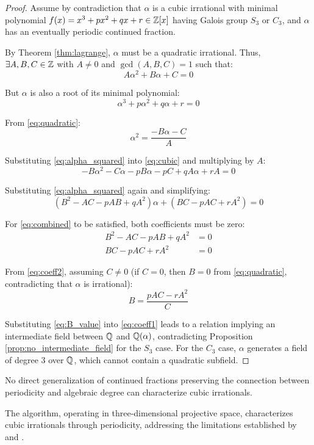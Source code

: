 \begin{proof}
Assume by contradiction that $\alpha$ is a cubic irrational with minimal polynomial $f(x) = x^3 + px^2 + qx + r \in \mathbb{Z}[x]$ having Galois group $S_3$ or $C_3$, and $\alpha$ has an eventually periodic continued fraction.

By Theorem \ref{thm:lagrange}, $\alpha$ must be a quadratic irrational. Thus, $\exists A, B, C \in \mathbb{Z}$ with $A \neq 0$ and $\gcd(A, B, C) = 1$ such that:
\begin{equation}\label{eq:quadratic}
A\alpha^2 + B\alpha + C = 0
\end{equation}

But $\alpha$ is also a root of its minimal polynomial:
\begin{equation}\label{eq:cubic}
\alpha^3 + p\alpha^2 + q\alpha + r = 0
\end{equation}

From \eqref{eq:quadratic}:
\begin{equation}\label{eq:alpha_squared}
\alpha^2 = \frac{-B\alpha - C}{A}
\end{equation}

Substituting \eqref{eq:alpha_squared} into \eqref{eq:cubic} and multiplying by $A$:
\begin{equation}
-B\alpha^2 - C\alpha - pB\alpha - pC + qA\alpha + rA = 0
\end{equation}

Substituting \eqref{eq:alpha_squared} again and simplifying:
\begin{equation}\label{eq:combined}
(B^2 - AC - pAB + qA^2)\alpha + (BC - pAC + rA^2) = 0
\end{equation}

For \eqref{eq:combined} to be satisfied, both coefficients must be zero:
\begin{align}
B^2 - AC - pAB + qA^2 &= 0 \label{eq:coeff1}\\
BC - pAC + rA^2 &= 0 \label{eq:coeff2}
\end{align}

From \eqref{eq:coeff2}, assuming $C \neq 0$ (if $C = 0$, then $B = 0$ from \eqref{eq:quadratic}, contradicting that $\alpha$ is irrational):
\begin{equation}\label{eq:B_value}
B = \frac{pAC - rA^2}{C}
\end{equation}

Substituting \eqref{eq:B_value} into \eqref{eq:coeff1} leads to a relation implying an intermediate field between $\mathbb{Q}$ and $\mathbb{Q}(\alpha)$, contradicting Proposition \ref{prop:no_intermediate_field} for the $S_3$ case. For the $C_3$ case, $\alpha$ generates a field of degree 3 over $\mathbb{Q}$, which cannot contain a quadratic subfield.
\end{proof}

\begin{corollary}\label{cor:cf_insufficient}
No direct generalization of continued fractions preserving the connection between periodicity and algebraic degree can characterize cubic irrationals.
\end{corollary}

The \HAPD{} algorithm, operating in three-dimensional projective space, characterizes cubic irrationals through periodicity, addressing the limitations established by \cite{Khinchin1964} and \cite{Cassels1957}.
